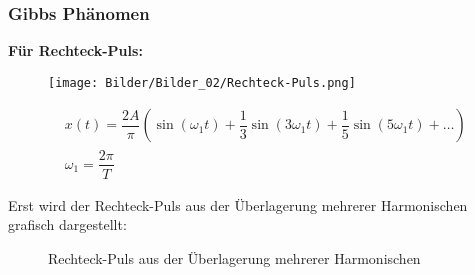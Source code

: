 
\subsubsection{\textbf{Gibbs Phänomen}}
\textbf{Für Rechteck-Puls:}
\begin{figure}[H]
    \centering
    \begin{minipage}[c]{.4\linewidth}
        \centering
        \texttt{[image: Bilder/Bilder\_02/Rechteck-Puls.png]}
        \nonumber
    \end{minipage}
    \begin{minipage}[c]{.5\linewidth}
        \begin{equation}
            \begin{aligned}
                &x(t)=\dfrac{2A}{\pi}(\sin(\omega_1 t)+\dfrac{1}{3}\sin(3\omega_1 t) +\dfrac{1}{5}\sin(5\omega_1 t)+\ldots )\\
                &\omega_1 = \dfrac{2\pi }{T}  
            \end{aligned}
            \nonumber
        \end{equation}
    \end{minipage}
\end{figure}
Erst wird der Rechteck-Puls aus der Überlagerung mehrerer Harmonischen grafisch dargestellt: 

\begin{figure}[H]
    \centering
    \caption{Rechteck-Puls aus der Überlagerung mehrerer Harmonischen}
\end{figure}


